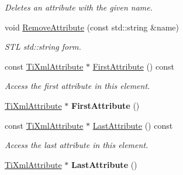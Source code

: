 \begin{DoxyCompactItemize}
\begin{DoxyCompactList}\small\item\em Deletes an attribute with the given name. \end{DoxyCompactList}\item 
void \hyperlink{class_ti_xml_element_a1afa6aea716511326a608e4c05df4f3a}{Remove\+Attribute} (const std\+::string \&name)\hypertarget{class_ti_xml_element_a1afa6aea716511326a608e4c05df4f3a}{}\label{class_ti_xml_element_a1afa6aea716511326a608e4c05df4f3a}

\begin{DoxyCompactList}\small\item\em S\+TL std\+::string form. \end{DoxyCompactList}\item 
const \hyperlink{class_ti_xml_attribute}{Ti\+Xml\+Attribute} $\ast$ \hyperlink{class_ti_xml_element_a516054c9073647d6cb29b6abe9fa0592}{First\+Attribute} () const \hypertarget{class_ti_xml_element_a516054c9073647d6cb29b6abe9fa0592}{}\label{class_ti_xml_element_a516054c9073647d6cb29b6abe9fa0592}

\begin{DoxyCompactList}\small\item\em Access the first attribute in this element. \end{DoxyCompactList}\item 
\hyperlink{class_ti_xml_attribute}{Ti\+Xml\+Attribute} $\ast$ {\bfseries First\+Attribute} ()\hypertarget{class_ti_xml_element_a4b33780fc565d38d6b54f640e0cf1737}{}\label{class_ti_xml_element_a4b33780fc565d38d6b54f640e0cf1737}

\item 
const \hyperlink{class_ti_xml_attribute}{Ti\+Xml\+Attribute} $\ast$ \hyperlink{class_ti_xml_element_a86191b49f9177be132b85b14655f1381}{Last\+Attribute} () const \hypertarget{class_ti_xml_element_a86191b49f9177be132b85b14655f1381}{}\label{class_ti_xml_element_a86191b49f9177be132b85b14655f1381}

\begin{DoxyCompactList}\small\item\em Access the last attribute in this element. \end{DoxyCompactList}\item 
\hyperlink{class_ti_xml_attribute}{Ti\+Xml\+Attribute} $\ast$ {\bfseries Last\+Attribute} ()\hypertarget{class_ti_xml_element_a222f81cf06155cd108f2a68d4d176004}{}\label{class_ti_xml_element_a222f81cf06155cd108f2a68d4d176004}


\end{DoxyCompactItemize}
